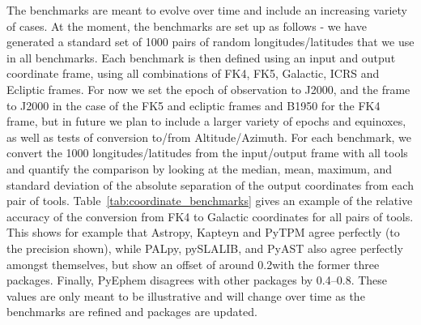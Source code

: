 \documentclass[modern]{aastex61}
\newcommand{\astropy}{Astropy\xspace}
\renewcommand{\tablename}{Table\xspace}
\newcommand{\inlinecomment}[2]{\todo[inline]{#1: #2}\xspace}
\begin{document}
The benchmarks are meant to evolve over time and include an increasing variety of cases. At the moment, the benchmarks are set up as follows - we have generated a standard set of 1000 pairs of random longitudes/latitudes that we use in all benchmarks. Each benchmark is then defined using an input and output coordinate frame, using all combinations of FK4, FK5, Galactic, ICRS and Ecliptic frames. For now we set the epoch of observation to J2000, and the frame to J2000 in the case of the FK5 and ecliptic frames and B1950 for the FK4 frame, but in future we plan to include a larger variety of epochs and equinoxes, as well as tests of conversion to/from Altitude/Azimuth. For each benchmark, we convert the 1000 longitudes/latitudes from the input/output frame with all tools and quantify the comparison by looking at the median, mean, maximum, and standard deviation of the absolute separation of the output coordinates from each pair of tools. \tablename~\ref{tab:coordinate_benchmarks} gives an example of the relative accuracy of the conversion from FK4 to Galactic coordinates for all pairs of tools. This shows for example that \astropy, Kapteyn and PyTPM agree perfectly (to the precision shown), while PALpy, pySLALIB, and PyAST also agree perfectly amongst themselves, but show an offset of around 0.2\arcsec with the former three packages. Finally, PyEphem disagrees with other packages by 0.4--0.8\arcsec. These values are only meant to be illustrative and will change over time as the benchmarks are refined and packages are updated.
\end{document}
